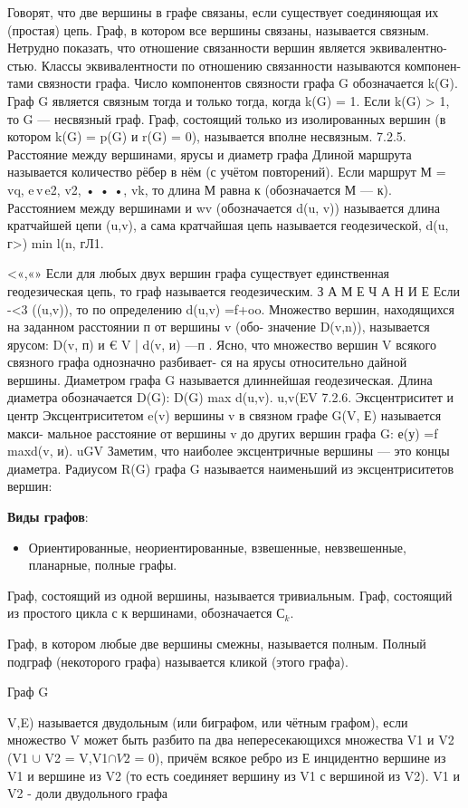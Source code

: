 \documentclass[
]{article}
\providecommand{\tightlist}{%
  \setlength{\itemsep}{0pt}\setlength{\parskip}{0pt}}
\begin{document}
\begin{enumerate}
{{{Говорят, что две вершины в графе связаны, если существует соединяющая их
(простая) цепь. Граф, в котором все вершины связаны, называется связным.
Нетрудно показать, что отношение связанности вершин является эквивалентно-
стью. Классы эквивалентности по отношению связанности называются компонен-
тами связности графа. Число компонентов связности графа G обозначается k(G).
Граф G является связным тогда и только тогда, когда k(G) = 1. Если k(G) > 1,
то G — несвязный граф. Граф, состоящий только из изолированных вершин (в
котором k(G) = p(G) и r(G) = 0), называется вполне несвязным.
7.2.5. Расстояние между вершинами, ярусы
и диаметр графа
Длиной маршрута называется количество рёбер в нём (с учётом повторений).
Если маршрут М = vq, e\,v\,e2, v2, • • •, vk, то длина М равна к (обозначается
М — к). Расстоянием между вершинами и wv (обозначается d(u, v)) называется
длина кратчайшей цепи (u,v), а сама кратчайшая цепь называется геодезической,
d(u, г>) min l(n, гЛ1.{<«,«»
Если для любых двух вершин графа существует единственная геодезическая
цепь, то граф называется геодезическим.
З А М Е Ч А Н И Е
Если -<3 ((u,v)), то по определению d(u,v) =f+oo.
Множество вершин, находящихся на заданном расстоянии п от вершины v (обо-
значение D(v,n)), называется ярусом:
D(v, п) {и € V | d(v, и) —п} .
Ясно, что множество вершин V всякого связного графа однозначно разбивает-
ся на ярусы относительно дайной вершины. Диаметром графа G называется
длиннейшая геодезическая. Длина диаметра обозначается D(G):
D(G) max d(u,v).
u,v(EV
7.2.6. Эксцентриситет и центр
Эксцентриситетом e(v) вершины v в связном графе G(V, Е) называется макси-
мальное расстояние от вершины v до других вершин графа G:
е(у) =f maxd(v, и).
uGV
Заметим, что наиболее эксцентричные вершины — это концы диаметра. Радиусом
R(G) графа G называется наименьший из эксцентриситетов вершин:
\item
  \textbf{Виды графов}:

  \begin{itemize}
  \tightlist
  \item
    Ориентированные, неориентированные, взвешенные, невзвешенные,
    планарные, полные графы.
  \end{itemize}
Граф, состоящий из одной вершины, называется тривиальным. Граф, состоящий
из простого цикла с к вершинами, обозначается $С_k$.

Граф, в котором любые две вершины смежны, называется полным.
Полный подграф (некоторого графа) называется кликой (этого графа).

Граф G{V,E) называется двудольным (или биграфом, или чётным графом), если
множество V может быть разбито па два непересекающихся множества V1 и V2
(V1 $\cup$ V2 = V,V1$\cap V2$ = 0), причём всякое ребро из Е инцидентно вершине из V1
и вершине из V2 (то есть соединяет вершину из V1 с вершиной из V2).
V1 и V2 - доли двудольного графа

}}}}}
\end{enumerate}
\end{document}
